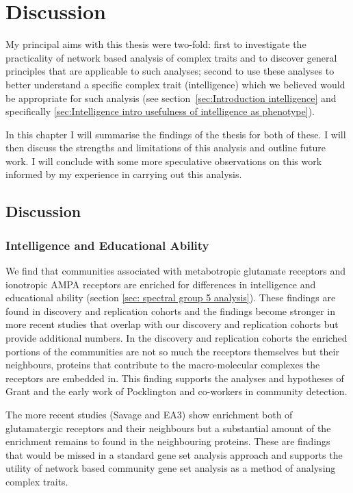 \chapter{Discussion}

My principal aims with this thesis were two-fold: first to investigate the practicality of network based analysis of complex traits and to discover general  principles that are applicable to such analyses; second to use these analyses to better understand a specific complex trait (intelligence) which we believed would be appropriate for such analysis (see section~\ref{sec:Introduction intelligence} and specifically  \ref{sec:Intelligence intro usefulness of intelligence as phenotype}).

In this chapter I will summarise the findings of the thesis for both of these. I will then discuss the strengths and limitations of this analysis and outline future work. I will conclude with some more speculative observations on this work informed by my experience in carrying out this analysis.
\section{Discussion}
\subsection{Intelligence and Educational Ability}
We find that communities associated with metabotropic glutamate receptors and ionotropic AMPA receptors are enriched for differences in intelligence and educational ability (section \ref{sec: spectral group 5 analysis}). These findings are found in discovery and replication cohorts and the findings become stronger in more recent studies that overlap with our discovery and replication cohorts but provide additional numbers. 
In the discovery and replication cohorts the enriched portions of the communities are not so much the receptors themselves but their neighbours, proteins that contribute to the macro-molecular complexes the receptors are embedded in. This finding supports the analyses and hypotheses of Grant \cite{grant2012synaptopathies} and the early work of Pocklington and co-workers \cite{pocklington2006proteomes} in community detection. 

The more recent studies (Savage and EA3)\cite{savage2018genome} \cite{lee2018gene} show enrichment both of glutamatergic receptors and their neighbours but a substantial amount of the enrichment remains to found in the neighbouring proteins. These are findings that would be missed in a standard gene set analysis approach and supports the utility of network based community gene set analysis as a method of analysing complex traits. 

